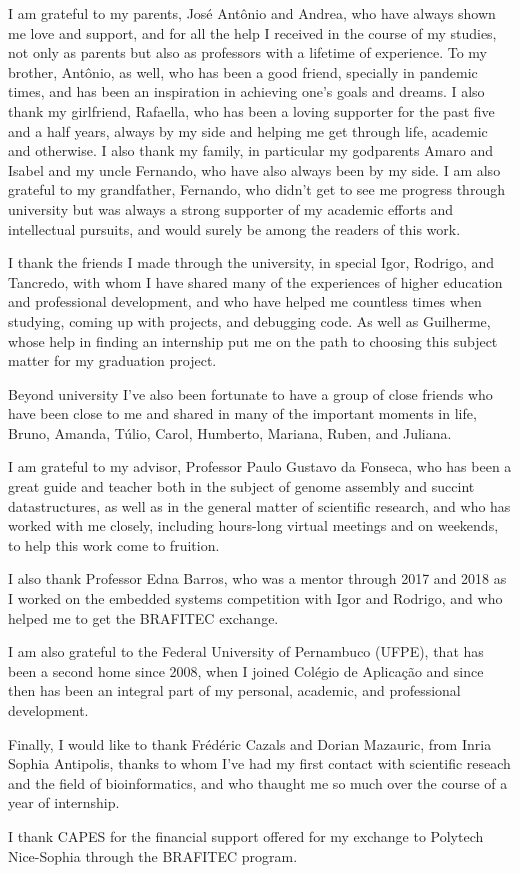\acknowledgements

I am grateful to my parents, José Antônio and Andrea, who have always shown me love and support, and for all the help I received in the course of my studies, not only as parents but also as professors with a lifetime of experience. To my brother, Antônio, as well, who has been a good friend, specially in pandemic times, and has been an inspiration in achieving one's goals and dreams. I also thank my girlfriend, Rafaella, who has been a loving supporter for the past five and a half years, always by my side and helping me get through life, academic and otherwise. I also thank my family, in particular my godparents Amaro and Isabel and my uncle Fernando, who have also always been by my side. I am also grateful to my grandfather, Fernando, who didn't get to see me progress through university but was always a strong supporter of my academic efforts and intellectual pursuits, and would surely be among the readers of this work.

I thank the friends I made through the university, in special Igor, Rodrigo, and Tancredo, with whom I have shared many of the experiences of higher education and professional development, and who have helped me countless times when studying, coming up with projects, and debugging code. As well as Guilherme, whose help in finding an internship put me on the path to choosing this subject matter for my graduation project.

Beyond university I've also been fortunate to have a group of close friends who have been close to me and shared in many of the important moments in life, Bruno, Amanda, Túlio, Carol, Humberto, Mariana, Ruben, and Juliana.

I am grateful to my advisor, Professor Paulo Gustavo da Fonseca, who has been a great guide and teacher both in the subject of genome assembly and succint datastructures, as well as in the general matter of scientific research, and who has worked with me closely, including hours-long virtual meetings and on weekends, to help this work come to fruition.

I also thank Professor Edna Barros, who was a mentor through 2017 and 2018 as I worked on the embedded systems competition with Igor and Rodrigo, and who helped me to get the BRAFITEC exchange.

I am also grateful to the Federal University of Pernambuco (UFPE), that has been a second home since 2008, when I joined Colégio de Aplicação and since then has been an integral part of my personal, academic, and professional development.

Finally, I would like to thank Frédéric Cazals and Dorian Mazauric, from Inria Sophia Antipolis, thanks to whom I've had my first contact with scientific reseach and the field of bioinformatics, and who thaught me so much over the course of a year of internship.

I thank CAPES for the financial support offered for my exchange to Polytech Nice-Sophia through the BRAFITEC program.